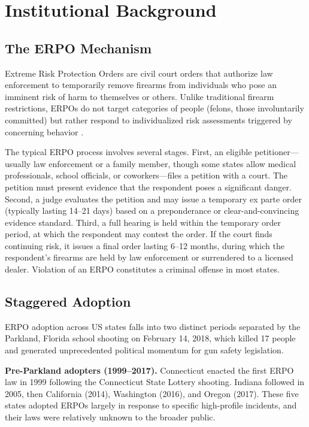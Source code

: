 \documentclass[12pt]{article}
\begin{document}
\section{Institutional Background}

\subsection{The ERPO Mechanism}

Extreme Risk Protection Orders are civil court orders that authorize law enforcement to temporarily remove firearms from individuals who pose an imminent risk of harm to themselves or others. Unlike traditional firearm restrictions, ERPOs do not target categories of people (felons, those involuntarily committed) but rather respond to individualized risk assessments triggered by concerning behavior \citep{swanson2014implementation}.

The typical ERPO process involves several stages. First, an eligible petitioner---usually law enforcement or a family member, though some states allow medical professionals, school officials, or coworkers---files a petition with a court. The petition must present evidence that the respondent poses a significant danger. Second, a judge evaluates the petition and may issue a temporary ex parte order (typically lasting 14--21 days) based on a preponderance or clear-and-convincing evidence standard. Third, a full hearing is held within the temporary order period, at which the respondent may contest the order. If the court finds continuing risk, it issues a final order lasting 6--12 months, during which the respondent's firearms are held by law enforcement or surrendered to a licensed dealer. Violation of an ERPO constitutes a criminal offense in most states.

\subsection{Staggered Adoption}

ERPO adoption across US states falls into two distinct periods separated by the Parkland, Florida school shooting on February 14, 2018, which killed 17 people and generated unprecedented political momentum for gun safety legislation.

\textbf{Pre-Parkland adopters (1999--2017).} Connecticut enacted the first ERPO law in 1999 following the Connecticut State Lottery shooting. Indiana followed in 2005, then California (2014), Washington (2016), and Oregon (2017). These five states adopted ERPOs largely in response to specific high-profile incidents, and their laws were relatively unknown to the broader public.
\end{document}
